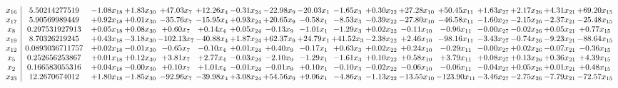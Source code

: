 \documentclass[9pt]{article}
\begin{document}
 \[\begin{array}{c| c c@{\hskip 2pt} c@{\hskip 2pt} c@{\hskip 2pt} c@{\hskip 2pt} c@{\hskip 2pt} c@{\hskip 2pt} c@{\hskip 2pt} c@{\hskip 2pt} c@{\hskip 2pt} c@{\hskip 2pt} c@{\hskip 2pt} c@{\hskip 2pt} c@{\hskip 2pt} c@{\hskip 2pt} c@{\hskip 2pt} }
 x_{16}   &  5.50214277519 & -1.08 x_{18} & +  1.83 x_{30} & + 47.03 x_{7} & + 12.26 x_{4} & -0.31 x_{24} & -22.98 x_{9} & -20.03 x_{1} & -1.65 x_{3} & +  0.30 x_{22} & + 27.28 x_{10} & + 50.45 x_{11} & +  1.63 x_{27} & +  2.17 x_{26} & +  4.31 x_{21} & + 69.20 x_{15}\\
 x_{17}   &  5.90569989449 & +  0.92 x_{18} & +  0.01 x_{30} & -35.76 x_{7} & -15.95 x_{4} & +  0.93 x_{24} & + 20.65 x_{9} & -0.58 x_{1} & -8.53 x_{3} & -0.39 x_{22} & -27.80 x_{10} & -46.58 x_{11} & -1.60 x_{27} & -2.15 x_{26} & -2.37 x_{21} & -25.48 x_{15}\\
 x_{8}   &  0.297531927913 & +  0.05 x_{18} & +  0.08 x_{30} & +  0.60 x_{7} & +  0.14 x_{4} & +  0.05 x_{24} & -0.13 x_{9} & -1.01 x_{1} & -1.29 x_{3} & +  0.02 x_{22} & -0.11 x_{10} & -0.96 x_{11} & -0.00 x_{27} & -0.02 x_{26} & +  0.05 x_{21} & +  0.77 x_{15}\\
 x_{19}   &  8.70326219245 & +  0.43 x_{18} & -3.18 x_{30} & -102.13 x_{7} & -40.88 x_{4} & +  1.87 x_{24} & + 62.37 x_{9} & + 24.79 x_{1} & + 41.52 x_{3} & -2.38 x_{22} & +  2.46 x_{10} & -98.16 x_{11} & -3.43 x_{27} & -0.74 x_{26} & -9.23 x_{21} & -88.64 x_{15}\\
 x_{12}   &  0.0893036711757 & +  0.02 x_{18} & -0.01 x_{30} & -0.65 x_{7} & -0.10 x_{4} & +  0.01 x_{24} & +  0.40 x_{9} & -0.17 x_{1} & +  0.63 x_{3} & +  0.02 x_{22} & +  0.24 x_{10} & -0.29 x_{11} & -0.00 x_{27} & +  0.02 x_{26} & -0.07 x_{21} & -0.36 x_{15}\\
 x_{5}   &  0.252656253867 & +  0.01 x_{18} & +  0.12 x_{30} & +  3.81 x_{7} & +  2.77 x_{4} & -0.03 x_{24} & -2.10 x_{9} & -1.29 x_{1} & -1.61 x_{3} & +  0.10 x_{22} & +  0.58 x_{10} & +  3.79 x_{11} & +  0.08 x_{27} & +  0.13 x_{26} & +  0.36 x_{21} & +  4.39 x_{15}\\
 x_{2}   &  0.166583055316 & +  0.04 x_{18} & -0.00 x_{30} & +  0.10 x_{7} & +  1.01 x_{4} & -0.01 x_{24} & -0.01 x_{9} & +  0.10 x_{1} & -0.10 x_{3} & -0.02 x_{22} & -0.06 x_{10} & -0.06 x_{11} & -0.04 x_{27} & +  0.05 x_{26} & +  0.01 x_{21} & +  0.48 x_{15}\\
 x_{23}   &  12.2670674012 & +  1.80 x_{18} & -1.85 x_{30} & -92.96 x_{7} & -39.98 x_{4} & +  3.08 x_{24} & + 54.56 x_{9} & +  9.06 x_{1} & -4.86 x_{3} & -1.13 x_{22} & -13.55 x_{10} & -123.90 x_{11} & -3.46 x_{27} & -2.75 x_{26} & -7.79 x_{21} & -72.57 x_{15}\\

\end{array}\]
\end{document}
